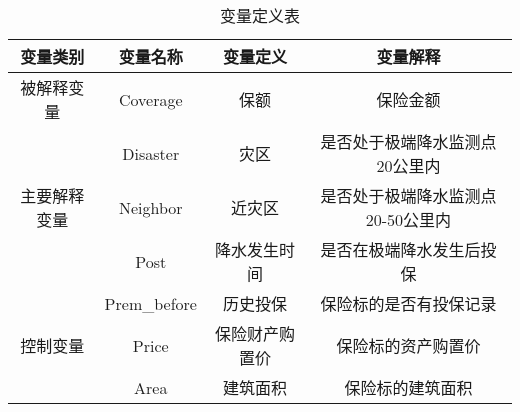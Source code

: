 \begin{table}[H]
    \caption{变量定义表}\label{tab:var}
    \centering
    \begin{tabular}{@{}cccc@{}}
        \toprule
        变量类别                    & 变量名称         & 变量定义    & 变量解释                \\ \midrule
        被解释变量                   & Coverage     & 保额      & 保险金额                \\ \midrule
        \multirow{3}{*}{主要解释变量} & Disaster     & 灾区      & 是否处于极端降水监测点20公里内    \\ \cmidrule(l){2-4}
                                & Neighbor     & 近灾区     & 是否处于极端降水监测点20-50公里内 \\ \cmidrule(l){2-4}
                                & Post         & 降水发生时间  & 是否在极端降水发生后投保        \\
        \midrule
        \multirow{3}{*}{控制变量}   & Prem\_before & 历史投保    & 保险标的是否有投保记录         \\ \cmidrule(l){2-4}
                                & Price        & 保险财产购置价 & 保险标的资产购置价           \\ \cmidrule(l){2-4}
                                & Area         & 建筑面积    & 保险标的建筑面积            \\ %
        \bottomrule
    \end{tabular}
\end{table}
